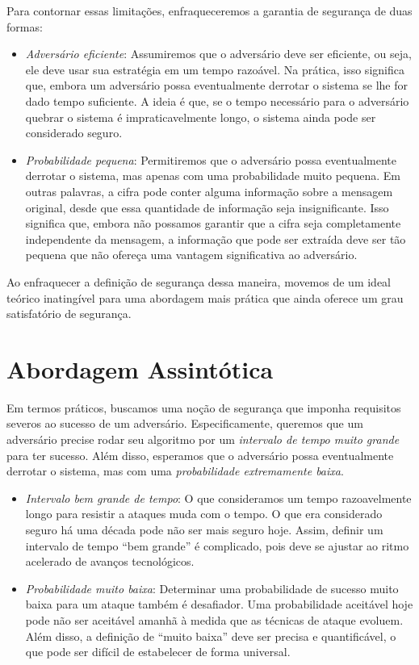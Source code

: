 Para contornar essas limitações, enfraqueceremos a garantia de segurança de duas formas:
\begin{itemize}
\item[] {\em Adversário eficiente}:
  Assumiremos que o adversário deve ser eficiente, ou seja, ele deve usar sua estratégia em um tempo razoável.
  Na prática, isso significa que, embora um adversário possa eventualmente derrotar o sistema se lhe for dado tempo suficiente.
  A ideia é que, se o tempo necessário para o adversário quebrar o sistema é impraticavelmente longo, o sistema ainda pode ser considerado seguro.
\item[] {\em Probabilidade pequena}:
  Permitiremos que o adversário possa eventualmente derrotar o sistema, mas apenas com uma probabilidade muito pequena.
  Em outras palavras, a cifra pode conter alguma informação sobre a mensagem original, desde que essa quantidade de informação seja insignificante.
  Isso significa que, embora não possamos garantir que a cifra seja completamente independente da mensagem, a informação que pode ser extraída deve ser tão pequena que não ofereça uma vantagem significativa ao adversário.
\end{itemize}

Ao enfraquecer a definição de segurança dessa maneira, movemos de um ideal teórico inatingível para uma abordagem mais prática que ainda oferece um grau satisfatório de segurança.

\section{Abordagem Assintótica}
\label{sec:abord-assint}

Em termos práticos, buscamos uma noção de segurança que imponha requisitos severos ao sucesso de um adversário.
Especificamente, queremos que um adversário precise rodar seu algoritmo por um {\em intervalo de tempo muito grande} para ter sucesso.
Além disso, esperamos que o adversário possa eventualmente derrotar o sistema, mas com uma {\em probabilidade extremamente baixa}.

\begin{itemize}
\item[] {\em Intervalo bem grande de tempo}:
  O que consideramos um tempo razoavelmente longo para resistir a ataques muda com o tempo.
  O que era considerado seguro há uma década pode não ser mais seguro hoje.
  Assim, definir um intervalo de tempo ``bem grande'' é complicado, pois deve se ajustar ao ritmo acelerado de avanços tecnológicos.

\item[] {\em Probabilidade muito baixa}:
  Determinar uma probabilidade de sucesso muito baixa para um ataque também é desafiador.
  Uma probabilidade aceitável hoje pode não ser aceitável amanhã à medida que as técnicas de ataque evoluem.
  Além disso, a definição de ``muito baixa'' deve ser precisa e quantificável, o que pode ser difícil de estabelecer de forma universal.
\end{itemize}

